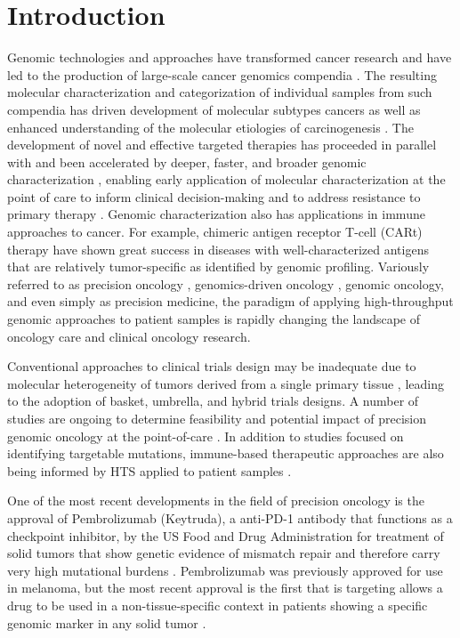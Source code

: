 \documentclass{article}
\begin{document}
\section{Introduction}
Genomic technologies and approaches have transformed cancer research
and have led to the production of large-scale cancer genomics
compendia
\parencite{noauthor_undated-vx,Cancer_Genome_Atlas_Research_Network2013-gt}. The
resulting molecular characterization and categorization of individual
samples from such compendia has driven development of molecular
subtypes cancers as well as enhanced understanding of the molecular
etiologies of carcinogenesis
\parencite{Cancer_Genome_Atlas_Network2012-nz,Cancer_Genome_Atlas_Research_Network2015-gd,noauthor_2008-wg}. The
development of novel and effective targeted therapies has proceeded in
parallel with and been accelerated by deeper, faster, and broader
genomic characterization \parencite{Blumenthal2016-fb}, enabling early
application of molecular characterization at the point of care to
inform clinical decision-making
\parencite{Flaherty2012-dq,Shaw2013-wl,Maemondo2010-dj,Druker2006-qk} and
to address resistance to primary therapy \parencite{Ai2014-nf}. Genomic
characterization also has applications in immune approaches to
cancer. For example, chimeric antigen receptor T-cell (CARt) therapy
have shown great success in diseases with well-characterized antigens
that are relatively tumor-specific \parencite{Grupp2013-nd} as identified
by genomic profiling. Variously referred to as precision oncology
\parencite{Sohal2015-bi}, genomics-driven oncology \parencite{Garraway2013-zo},
genomic oncology, and even simply as precision medicine, the paradigm
of applying high-throughput genomic approaches to patient samples is
rapidly changing the landscape of oncology care and clinical oncology
research.

Conventional approaches to clinical trials design may be inadequate
due to molecular heterogeneity of tumors derived from a single primary
tissue \parencite{Simon2016-ik}, leading to the adoption of basket,
umbrella, and hybrid trials designs. A number of studies are ongoing
to determine feasibility and potential impact of precision genomic
oncology at the point-of-care
\parencite{Cheng2015-wh,noauthor_undated-da,Lopez-Chavez2015-cg}. In
addition to studies focused on identifying targetable mutations,
immune-based therapeutic approaches are also being informed by HTS
applied to patient samples
\parencite{Bethune2017-ns,Chalmers2017-ya,Faltas2016-yz}.

One of the most recent developments in the field of precision oncology
is the approval of Pembrolizumab (Keytruda), a anti-PD-1 antibody that
functions as a checkpoint inhibitor, by the US Food and Drug
Administration for treatment of solid tumors that show genetic
evidence of mismatch repair and therefore carry very high mutational
burdens \parencite{Le2017-vc}. Pembrolizumab was previously approved for use in
melanoma, but the most recent approval is the first that is targeting
allows a drug to be used in a non-tissue-specific context in patients
showing a specific genomic marker in any solid tumor
\parencite{Garber2017-sk}. 
\end{document}
